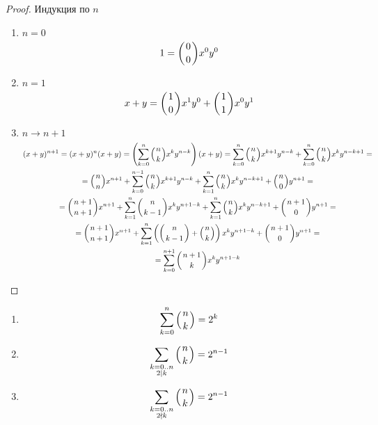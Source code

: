 \begin{proof}
Индукция по $n$
\begin{enumerate}
\item $n = 0$
\[ 1 = {\left(0 \atop 0\right)}x^0y^0 \]
\item $n = 1$
\[ x + y = {\left(1 \atop 0\right)} x^1y^0 + {\left(1 \atop 1\right)}x^0y^1 \]
\item $n \to n + 1$
\begin{gather*}
(x + y)^{n + 1} = (x + y)^{n}(x + y) = \left(\sum_{k = 0}^{n}{\left(n \atop k\right)}x^ky^{n - k}\right)(x + y) = \sum_{k = 0}^{n}{\left(n \atop k\right)}x^{k + 1}y^{n - k} + \sum_{k = 0}^{n}{\left(n \atop k\right)}x^ky^{n - k + 1} = \\
= {\left(n \atop n\right)}x^{n + 1} + \sum_{k = 0}^{n - 1}{\left(n \atop k\right)}x^{k + 1}y^{n - k} + \sum_{k = 1}^{n}{\left(n \atop k\right)}x^ky^{n - k + 1} + {\left(n \atop 0\right)} y^{n + 1} = \\
= {\left(n + 1 \atop n + 1\right)}x^{n + 1} + \sum_{k = 1}^{n}{\left(n \atop k - 1\right)}x^{k}y^{n + 1 - k} + \sum_{k = 1}^{n} {\left(n \atop k\right)}x^ky^{n - k + 1} + {\left(n + 1 \atop 0\right)}y^{n + 1} = \\
= {\left(n + 1 \atop n + 1\right)}x^{n + 1} + \sum_{k = 1}^{n}\left({\left(n \atop k - 1\right)} + {\left(n \atop k\right)}\right) x^{k}y^{n + 1 - k} + {\left(n + 1 \atop 0\right)}y^{n + 1} = \\
= \sum_{k = 0}^{n + 1} {\left(n + 1 \atop k\right)}x^{k}y^{n + 1 - k} \\
\end{gather*}
\end{enumerate}
\end{proof}

\begin{conseq}
\begin{enumerate}
\item \[ \sum_{k = 0}^{n}{\left(n \atop k\right)} = 2^k \]
\item \[ \sum_{\substack{k = 0..n \\ 2  \mid k}} {\left(n \atop k\right)} = 2^{n - 1} \]
\item \[ \sum_{\substack{k = 0..n \\ 2 \nmid k}} {\left(n \atop k\right)} = 2^{n - 1} \]
\end{enumerate}
\end{conseq}